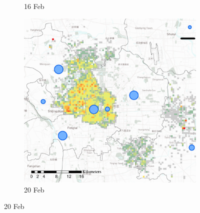 \documentclass[preprints,ijgi,submit,moreauthors]{Definitions/mdpi}
\begin{document}
\begin{figure}[ht]
\begin{subfigure}{.3\textwidth}
        \caption{16 Feb}
    \end{subfigure}
    \begin{subfigure}{.3\textwidth}
        \includegraphics[width=\textwidth]{Figures/Relation_with_confrimed_cases/NewDistrictSSBD2020_02_20.eps}
        \caption{20 Feb}
    \end{subfigure}
    

\end{figure}
\end{document}
